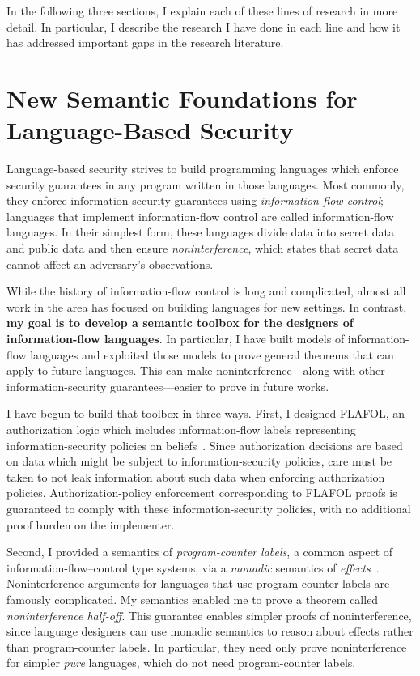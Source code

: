 \documentclass{article}
\theoremstyle{definition}
\begin{document}
In the following three sections, I explain each of these lines of research in more detail.
In particular, I describe the research I have done in each line and how it has addressed important gaps in the research literature.

\section*{New Semantic Foundations for Language-Based Security}

Language-based security strives to build programming languages which enforce security guarantees in any program written in those languages.
Most commonly, they enforce information-security guarantees using \emph{information-flow control}; languages that implement information-flow control are called information-flow languages.
In their simplest form, these languages divide data into secret data and public data and then ensure \emph{noninterference}, which states that secret data cannot affect an adversary's observations.

While the history of information-flow control is long and complicated, almost all work in the area has focused on building languages for new settings.
In contrast, \textbf{my goal is to develop a semantic toolbox for the designers of information-flow languages}.
In particular, I have built models of information-flow languages and exploited those models to prove general theorems that can apply to future languages.
This can make noninterference---along with other information-security guarantees---easier to prove in future works.

I have begun to build that toolbox in three ways.
First, I designed FLAFOL, an authorization logic which includes information-flow labels representing information-security policies on beliefs~\citep{HirschACAT20}.
Since authorization decisions are based on data which might be subject to information-security policies, care must be taken to not leak information about such data when enforcing authorization policies.
Authorization-policy enforcement corresponding to FLAFOL proofs is guaranteed to comply with these information-security policies, with no additional proof burden on the implementer.

Second, I provided a semantics of \emph{program-counter labels}, a common aspect of information-flow--control type systems, via a \emph{monadic} semantics of \emph{effects}~\citep{HirschC21}.
Noninterference arguments for languages that use program-counter labels are famously complicated.
My semantics enabled me to prove a theorem called \emph{noninterference half-off}.
This guarantee enables simpler proofs of noninterference, since language designers can use monadic semantics to reason about effects rather than program-counter labels.
In particular, they need only prove noninterference for simpler \emph{pure} languages, which do not need program-counter labels.
\end{document}
